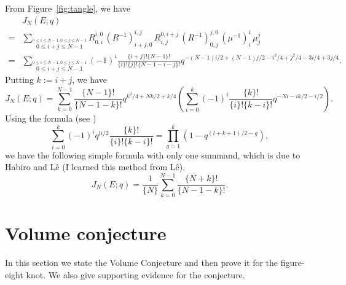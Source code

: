 \documentclass{amsart}
\theoremstyle{definition}
\theoremstyle{remark}
\numberwithin{equation}{section}
\begin{document}
From Figure~\ref{fig:tangle}, we have
\begin{equation*}
\begin{split}
  &J_N(E;q)
  \\
  =&
  \sum_{\stackrel{0\le i\le N-1,0\le j\le N-1}{0\le i+j\le N-1}}
  R^{i,0}_{0,i}\,
  (R^{-1})^{i,j}_{i+j,0}\,
  R^{0,i+j}_{i,j}\,
  (R^  {-1})^{j,0}_{0,j}\,
  (\mu^{-1})^{i}_{i}\,
  \mu^{j}_{j}
  \\
  =&
  \sum_{\stackrel{0\le i\le N-1,0\le j\le N-1}{0\le i+j\le N-1}}
  (-1)^i
  \frac{\{i+j\}!\{N-1\}!}{\{i\}!\{j\}!\{N-1-i-j\}!}
  q^{-(N-1)i/2+(N-1)j/2-i^2/4+j^2/4-3i/4+3j/4}.
\end{split}
\end{equation*}
Putting $k:=i+j$, we have
\begin{equation*}
  J_N(E;q)
  =
  \sum_{k=0}^{N-1}
  \frac{\{N-1\}!}{\{N-1-k\}!}q^{k^2/4+Nk/2+k/4}
  \left(
    \sum_{i=0}^{k}(-1)^i
    \frac{\{k\}!}{\{i\}!\{k-i\}!}
    q^{-Ni-ik/2-i/2}
  \right).
\end{equation*}
Using the formula (see \cite[Lemma~3.2]{Murakami/Murakami:ACTAM12001})
\begin{equation*}
  \sum_{i=0}^{k}(-1)^iq^{li/2}\frac{\{k\}!}{\{i\}!\{k-i\}!}
  =
  \prod_{g=1}^{k}(1-q^{(l+k+1)/2-g}),
\end{equation*}
we have the following simple formula with only one summand, which is due to Habiro and L{\^e} (I learned this method from L{\^e}).
\begin{equation}\label{eq:fig8_single}
  J_N(E;q)
  =
  \frac{1}{\{N\}}
  \sum_{k=0}^{N-1}\frac{\{N+k\}!}{\{N-1-k\}!}.
\end{equation}
\section{Volume conjecture}\label{sec:Volume_Conjecture}
In this section we state the Volume Conjecture and then prove it for the figure-eight knot.
We also give supporting evidence for the conjecture.
\end{document}
